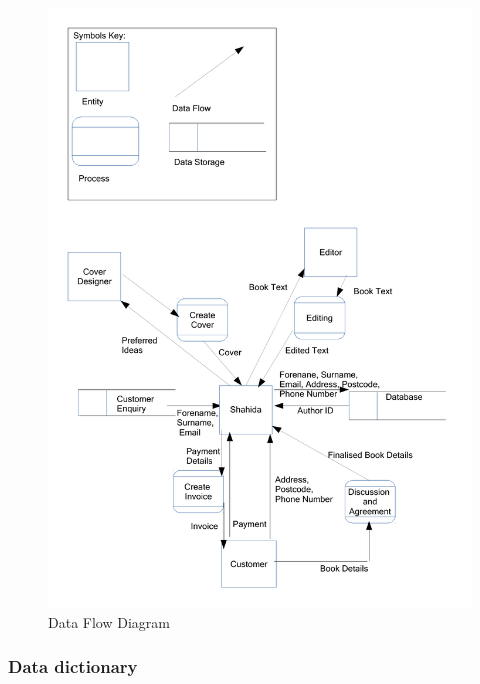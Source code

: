 \begin{figure}[H]
    \includegraphics[width=\textwidth]{./Analysis/Data_Flow_Diagrams_2.pdf}
    \caption{Data Flow Diagram} \label{Data_Flow_Diagrams_2.pdf}
\end{figure}

\subsubsection{Data dictionary}

